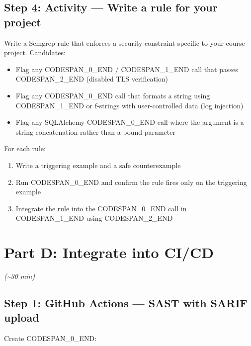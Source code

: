 \documentclass[11pt,a4paper]{book}
\begin{document}
\subsection{Step 4: Activity --- Write a rule for your project}

Write a Semgrep rule that enforces a security constraint specific to your course project. Candidates:

\begin{itemize}
  \item Flag any CODESPAN\_0\_END / CODESPAN\_1\_END call that passes CODESPAN\_2\_END (disabled TLS verification)
  \item Flag any CODESPAN\_0\_END call that formats a string using CODESPAN\_1\_END or f-strings with user-controlled data (log injection)
  \item Flag any SQLAlchemy CODESPAN\_0\_END call where the argument is a string concatenation rather than a bound parameter
\end{itemize}

For each rule:
\begin{enumerate}
  \item Write a triggering example and a safe counterexample
  \item Run CODESPAN\_0\_END and confirm the rule fires only on the triggering example
  \item Integrate the rule into the CODESPAN\_0\_END call in CODESPAN\_1\_END using CODESPAN\_2\_END
\end{enumerate}

\medskip

\section{Part D: Integrate into CI/CD}

\textit{(\textasciitilde{}30 min)}

\subsection{Step 1: GitHub Actions --- SAST with SARIF upload}

Create CODESPAN\_0\_END:
\end{document}
